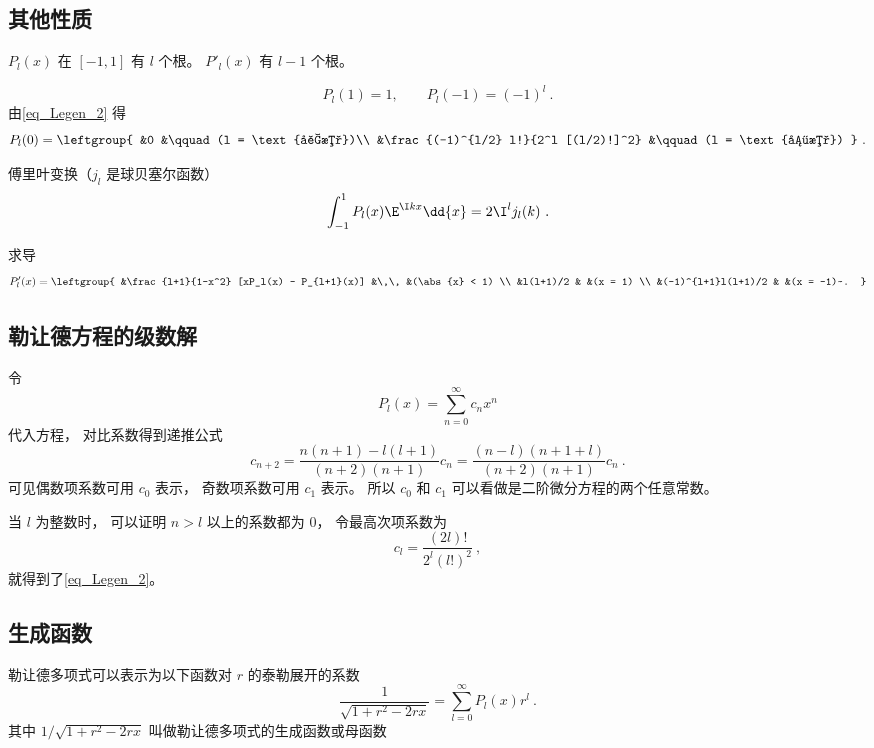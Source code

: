 \subsection{其他性质}

$P_l(x)$ 在 $[-1,1]$ 有 $l$ 个根。 $P'_l(x)$ 有 $l-1$ 个根。

\begin{equation}
P_l(1) = 1, \qquad P_l(-1) = (-1)^l~.
\end{equation}
由\autoref{eq_Legen_2} 得
\begin{equation}\label{eq_Legen_5}
P_l(0) = \leftgroup{
&0 &\qquad (l = \text{奇数})\\
&\frac{(-1)^{l/2} l!}{2^l [(l/2)!]^2} &\qquad (l = \text{偶数})
}~.\end{equation}

傅里叶变换（$j_l$ 是球贝塞尔函数）
\begin{equation}\label{eq_Legen_3}
\int_{-1}^1 P_l(x) \E^{\I k x} \dd{x} = 2 \I^l j_l(k)~.
\end{equation}

求导
\begin{equation}\label{eq_Legen_6} %
P'_l(x) = \leftgroup{
    &\frac{l+1}{1-x^2} [xP_l(x) - P_{l+1}(x)] &\,\, &(\abs{x} < 1) \\
    &l(l+1)/2 & &(x = 1) \\
    &(-1)^{l+1}l(l+1)/2 & &(x = -1)~.
}\end{equation}

\subsection{勒让德方程的级数解}
令
\begin{equation}
P_l(x) = \sum_{n = 0}^\infty c_n x^n
\end{equation}
代入方程， 对比系数得到递推公式
\begin{equation}
c_{n+2} = \frac{n(n+1)-l(l+1)}{(n+2)(n+1)}c_n = \frac{(n-l)(n+1+l)}{(n+2)(n+1)}c_n~.
\end{equation}
可见偶数项系数可用 $c_0$ 表示， 奇数项系数可用 $c_1$ 表示。 所以 $c_0$ 和 $c_1$ 可以看做是二阶微分方程的两个任意常数。

当 $l$ 为整数时， 可以证明 $n > l$ 以上的系数都为 0， 令最高次项系数为
\begin{equation}
c_l = \frac{(2l)!}{2^l (l!)^2}~,
\end{equation}
就得到了\autoref{eq_Legen_2}。

\subsection{生成函数}
勒让德多项式可以表示为以下函数对 $r$ 的泰勒展开的系数
\begin{equation}
\frac{1}{\sqrt{1 + r^2 - 2rx}} = \sum_{l = 0}^\infty P_l(x) r^l~.
\end{equation}
其中 $1/\sqrt {1+ r^2 - 2rx}$ 叫做勒让德多项式的生成函数或母函数